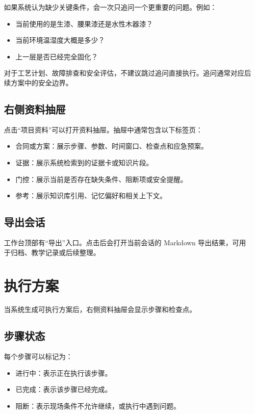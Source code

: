 \documentclass[UTF8,a4paper,12pt]{ctexart}
\begin{document}
如果系统认为缺少关键条件，会一次只追问一个更重要的问题。例如：

\begin{itemize}[leftmargin=2em]
  \item 当前使用的是生漆、腰果漆还是水性木器漆？
  \item 当前环境温湿度大概是多少？
  \item 上一层是否已经完全固化？
\end{itemize}

对于工艺计划、故障排查和安全评估，不建议跳过追问直接执行。追问通常对应后续方案中的安全边界。

\subsection{右侧资料抽屉}

点击“项目资料”可以打开资料抽屉。抽屉中通常包含以下标签页：

\begin{itemize}[leftmargin=2em]
  \item 合同或方案：展示步骤、参数、时间窗口、检查点和应急预案。
  \item 证据：展示系统检索到的证据卡或知识片段。
  \item 门控：展示当前是否存在缺失条件、阻断项或安全提醒。
  \item 参考：展示知识库引用、记忆偏好和相关上下文。
\end{itemize}

\subsection{导出会话}

工作台顶部有“导出”入口。点击后会打开当前会话的 Markdown 导出结果，可用于归档、教学记录或后续整理。

\section{执行方案}

当系统生成可执行方案后，右侧资料抽屉会显示步骤和检查点。

\subsection{步骤状态}

每个步骤可以标记为：

\begin{itemize}[leftmargin=2em]
  \item 进行中：表示正在执行该步骤。
  \item 已完成：表示该步骤已经完成。
  \item 阻断：表示现场条件不允许继续，或执行中遇到问题。
\end{itemize}
\end{document}

